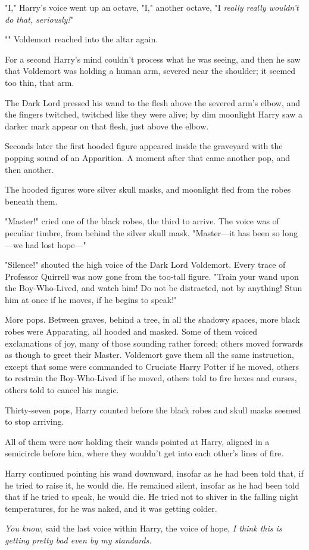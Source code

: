 "I," Harry's voice went up an octave, "I," another octave, "I \emph{really
really wouldn't do that, seriously!}"

"" Voldemort reached
into the altar again.

For a second Harry's mind couldn't process what he was seeing, and then he saw
that Voldemort was holding a human arm, severed near the shoulder; it seemed
too thin, that arm.

The Dark Lord pressed his wand to the flesh above the severed arm's elbow, and
the fingers twitched, twitched like they were alive; by dim moonlight Harry saw
a darker mark appear on that flesh, just above the elbow.

Seconds later the first hooded figure appeared inside the graveyard with the
popping sound of an Apparition. A moment after that came another pop, and then
another.

The hooded figures wore silver skull masks, and moonlight fled from the robes
beneath them.

"Master!" cried one of the black robes, the third to arrive. The voice was of
peculiar timbre, from behind the silver skull mask. "Master---it has been so
long---we had lost hope---"

"Silence!" shouted the high voice of the Dark Lord Voldemort. Every trace of
Professor Quirrell was now gone from the too-tall figure. "Train your wand upon
the Boy-Who-Lived, and watch him! Do not be distracted, not by anything! Stun
him at once if he moves, if he begins to speak!"

More pops. Between graves, behind a tree, in all the shadowy spaces, more black
robes were Apparating, all hooded and masked. Some of them voiced exclamations
of joy, many of those sounding rather forced; others moved forwards as though
to greet their Master. Voldemort gave them all the same instruction, except
that some were commanded to Cruciate Harry Potter if he moved, others to
restrain the Boy-Who-Lived if he moved, others told to fire hexes and curses,
others told to cancel his magic.

Thirty-seven pops, Harry counted before the black robes and skull masks seemed
to stop arriving.

All of them were now holding their wands pointed at Harry, aligned in a
semicircle before him, where they wouldn't get into each other's lines of fire.

Harry continued pointing his wand downward, insofar as he had been told that,
if he tried to raise it, he would die. He remained silent, insofar as he had
been told that if he tried to speak, he would die. He tried not to shiver in
the falling night temperatures, for he was naked, and it was getting colder.

\emph{You know,} said the last voice within Harry, the voice of hope, \emph{I
think this is getting pretty bad even by my standards.}
